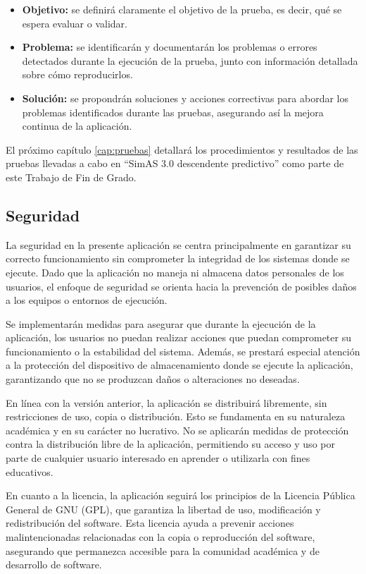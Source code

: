 \begin{itemize}
    \item \textbf{Objetivo:} se definirá claramente el objetivo de la prueba, es decir, qué se espera evaluar o validar.
    
    \item \textbf{Problema:} se identificarán y documentarán los problemas o errores detectados durante la ejecución de la prueba, junto con información detallada sobre cómo reproducirlos.

    \item \textbf{Solución:} se propondrán soluciones y acciones correctivas para abordar los problemas identificados durante las pruebas, asegurando así la mejora continua de la aplicación.
\end{itemize}

El próximo capítulo \ref{cap:pruebas} detallará los procedimientos y resultados de las pruebas llevadas a cabo en ``SimAS 3.0 descendente predictivo'' como parte de este Trabajo de Fin de Grado.


\subsection{Seguridad}
La seguridad en la presente aplicación se centra principalmente en garantizar su correcto funcionamiento sin comprometer la integridad de los sistemas donde se ejecute. Dado que la aplicación no maneja ni almacena datos personales de los usuarios, el enfoque de seguridad se orienta hacia la prevención de posibles daños a los equipos o entornos de ejecución.

Se implementarán medidas para asegurar que durante la ejecución de la aplicación, los usuarios no puedan realizar acciones que puedan comprometer su funcionamiento o la estabilidad del sistema. Además, se prestará especial atención a la protección del dispositivo de almacenamiento donde se ejecute la aplicación, garantizando que no se produzcan daños o alteraciones no deseadas.

En línea con la versión anterior, la aplicación se distribuirá libremente, sin restricciones de uso, copia o distribución. Esto se fundamenta en su naturaleza académica y en su carácter no lucrativo. No se aplicarán medidas de protección contra la distribución libre de la aplicación, permitiendo su acceso y uso por parte de cualquier usuario interesado en aprender o utilizarla con fines educativos.

En cuanto a la licencia, la aplicación seguirá los principios de la Licencia Pública General de GNU (GPL), que garantiza la libertad de uso, modificación y redistribución del software. Esta licencia ayuda a prevenir acciones malintencionadas relacionadas con la copia o reproducción del software, asegurando que permanezca accesible para la comunidad académica y de desarrollo de software.